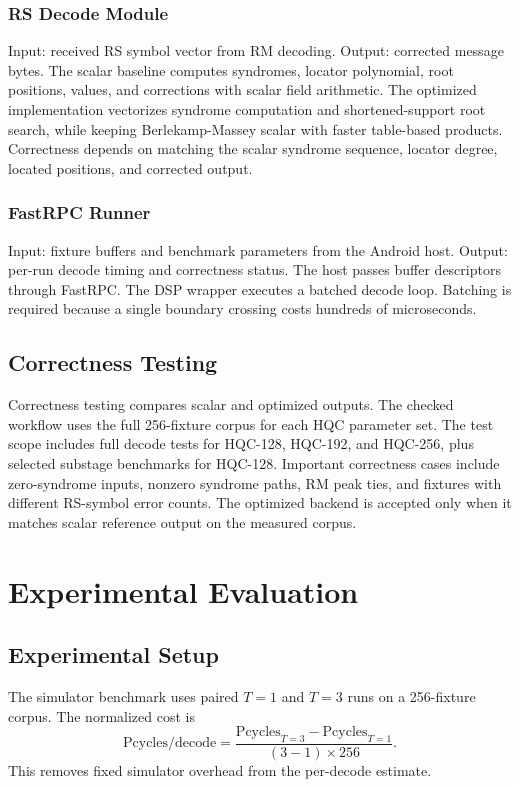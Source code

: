 \documentclass[12pt,a4paper]{report}
\begin{document}
\subsection{RS Decode Module}
Input: received RS symbol vector from RM decoding. Output: corrected message bytes. The scalar baseline computes syndromes, locator polynomial, root positions, values, and corrections with scalar field arithmetic. The optimized implementation vectorizes syndrome computation and shortened-support root search, while keeping Berlekamp-Massey scalar with faster table-based products. Correctness depends on matching the scalar syndrome sequence, locator degree, located positions, and corrected output.

\subsection{FastRPC Runner}
Input: fixture buffers and benchmark parameters from the Android host. Output: per-run decode timing and correctness status. The host passes buffer descriptors through FastRPC. The DSP wrapper executes a batched decode loop. Batching is required because a single boundary crossing costs hundreds of microseconds.

\section{Correctness Testing}
Correctness testing compares scalar and optimized outputs. The checked workflow uses the full 256-fixture corpus for each HQC parameter set. The test scope includes full decode tests for HQC-128, HQC-192, and HQC-256, plus selected substage benchmarks for HQC-128. Important correctness cases include zero-syndrome inputs, nonzero syndrome paths, RM peak ties, and fixtures with different RS-symbol error counts. The optimized backend is accepted only when it matches scalar reference output on the measured corpus.

\chapter{Experimental Evaluation}
\label{chap:evaluation}

\section{Experimental Setup}
The simulator benchmark uses paired \(T=1\) and \(T=3\) runs on a 256-fixture corpus. The normalized cost is
\[
  \text{Pcycles/decode}
  =\frac{\text{Pcycles}_{T=3}-\text{Pcycles}_{T=1}}{(3-1)\times 256}.
\]
This removes fixed simulator overhead from the per-decode estimate.
\end{document}
